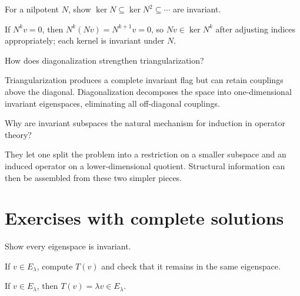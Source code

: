 \begin{problem}\label{prob:i10-problem-10}
For a nilpotent $N$, show $\ker N\subseteq\ker N^2\subseteq\cdots$ are invariant.
\end{problem}
\begin{solution}
If $N^kv=0$, then $N^k(Nv)=N^{k+1}v=0$, so $Nv\in\ker N^k$ after adjusting indices appropriately; each kernel is invariant under $N$.
\end{solution}

\begin{problem}\label{prob:i10-problem-11}
How does diagonalization strengthen triangularization?
\end{problem}
\begin{solution}
Triangularization produces a complete invariant flag but can retain couplings above the diagonal. Diagonalization decomposes the space into one-dimensional invariant eigenspaces, eliminating all off-diagonal couplings.
\end{solution}

\begin{problem}\label{prob:i10-problem-12}
Why are invariant subspaces the natural mechanism for induction in operator theory?
\end{problem}
\begin{solution}
They let one split the problem into a restriction on a smaller subspace and an induced operator on a lower-dimensional quotient. Structural information can then be assembled from these two simpler pieces.
\end{solution}


\section{Exercises with complete solutions}

\begin{exercise}\label{exr:i10-01}
Show every eigenspace is invariant.
\end{exercise}
\begin{hint}
If \(v\in E_\lambda\), compute \(T(v)\) and check that it remains in the same eigenspace.
\end{hint}
\begin{solution}
If $v\in E_\lambda$, then $T(v)=\lambda v\in E_\lambda$.
\end{solution}


